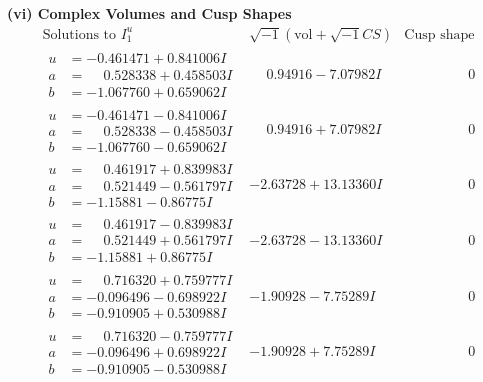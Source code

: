 \documentclass[1p]{elsarticle_modified}
\theoremstyle{definition}
\newcommand{\I}{\sqrt{-1}}
\begin{document}
\newpage\flushleft \textbf{(vi) Complex Volumes and Cusp Shapes}
$$\begin{array}{c|c|c}  
\text{Solutions to }I^u_{1}& \I (\text{vol} + \sqrt{-1}CS) & \text{Cusp shape}\\
 \hline 
\begin{aligned}
u &= -0.461471 + 0.841006 I \\
a &= \phantom{-}0.528338 + 0.458503 I \\
b &= -1.067760 + 0.659062 I\end{aligned}
 & \phantom{-}0.94916 - 7.07982 I & \phantom{-0.000000 } 0 \\ \hline\begin{aligned}
u &= -0.461471 - 0.841006 I \\
a &= \phantom{-}0.528338 - 0.458503 I \\
b &= -1.067760 - 0.659062 I\end{aligned}
 & \phantom{-}0.94916 + 7.07982 I & \phantom{-0.000000 } 0 \\ \hline\begin{aligned}
u &= \phantom{-}0.461917 + 0.839983 I \\
a &= \phantom{-}0.521449 - 0.561797 I \\
b &= -1.15881 - 0.86775 I\end{aligned}
 & -2.63728 + 13.13360 I & \phantom{-0.000000 } 0 \\ \hline\begin{aligned}
u &= \phantom{-}0.461917 - 0.839983 I \\
a &= \phantom{-}0.521449 + 0.561797 I \\
b &= -1.15881 + 0.86775 I\end{aligned}
 & -2.63728 - 13.13360 I & \phantom{-0.000000 } 0 \\ \hline\begin{aligned}
u &= \phantom{-}0.716320 + 0.759777 I \\
a &= -0.096496 - 0.698922 I \\
b &= -0.910905 + 0.530988 I\end{aligned}
 & -1.90928 - 7.75289 I & \phantom{-0.000000 } 0 \\ \hline\begin{aligned}
u &= \phantom{-}0.716320 - 0.759777 I \\
a &= -0.096496 + 0.698922 I \\
b &= -0.910905 - 0.530988 I\end{aligned}
 & -1.90928 + 7.75289 I & \phantom{-0.000000 } 0 \\ \hline\begin{aligned}

\end{aligned}
\end{array}$$
\end{document}
